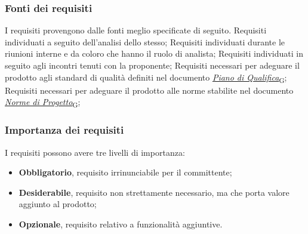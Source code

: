 \newpage

\subsubsection{Fonti dei requisiti}
\label{sec:fonti_requisiti}
I requisiti provengono dalle fonti meglio specificate di seguito.
Requisiti individuati a seguito dell'analisi dello stesso;
Requisiti individuati durante le riunioni interne e da coloro che hanno il ruolo di analista;
Requisiti individuati in seguito agli incontri tenuti con la proponente;
Requisiti necessari per adeguare il prodotto agli standard di qualità definiti nel documento \href{https://7last.github.io/docs/rtb/documentazione-interna/glossario\#piano-di-qualifica}{\textit{Piano di Qualifica}\textsubscript{G}};
Requisiti necessari per adeguare il prodotto alle norme stabilite nel documento
 \href{https://7last.github.io/docs/rtb/documentazione-interna/glossario\#norme-di-progetto}{\textit{Norme di Progetto}\textsubscript{G}};


\subsubsection{Importanza dei requisiti}
\label{sec:importanza_requisiti}
I requisiti possono avere tre livelli di importanza:
\begin{itemize}
	\item \textbf{Obbligatorio}, requisito irrinunciabile per il committente;
	\item \textbf{Desiderabile}, requisito non strettamente necessario, ma che porta valore aggiunto al prodotto;
	\item \textbf{Opzionale}, requisito relativo a funzionalità aggiuntive.
\end{itemize}

\pagebreak
